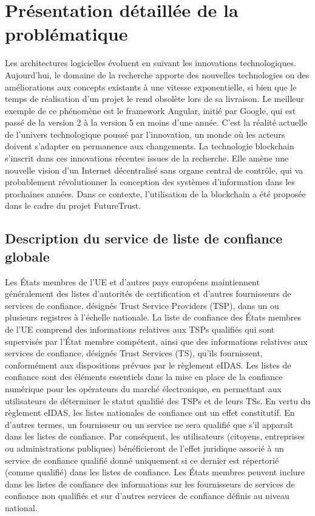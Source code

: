 \documentclass{tnreport}
\begin{document}
\chapter{Présentation détaillée de la problématique}

Les architectures logicielles évoluent en suivant les innovations technologiques. Aujourd'hui, le domaine de la recherche apporte des nouvelles technologies ou des améliorations aux concepts existants à une vitesse exponentielle, si bien que 
le temps de réalisation d'un projet le rend obsolète lors de sa livraison.
Le meilleur exemple de ce phénomène est le framework Angular, initié par Google, qui est passé de la version 2 à la version 5 en moins d'une année. C'est la réalité actuelle de l'univers technologique poussé par l'innovation, un monde où les acteurs doivent s'adapter en permanence aux changements. La technologie blockchain s'inscrit dans ces innovations récentes issues de la recherche. Elle amène une nouvelle vision d'un Internet décentralisé sans organe central de contrôle, qui va probablement révolutionner la conception des systèmes d'information dans les prochaines années. Dans ce contexte, l'utilisation de la blockchain a été proposée dans le cadre du projet FutureTrust.

\section{Description du service de liste de confiance globale}
\label{sec:description}

Les États membres de l'UE et d'autres pays européens maintiennent généralement des listes d'autorités de certification et d'autres fournisseurs de services de confiance, désignés Trust Service Providers (TSP), dans un ou plusieurs registres à l'échelle nationale.
La liste de confiance des États membres de l'UE comprend des informations relatives aux TSPs qualifiés qui sont supervisés par l'État membre compétent, ainsi que des informations relatives aux services de confiance, désignés Trust Services (TS), qu'ils fournissent, conformément aux dispositions prévues par le règlement eIDAS.
Les listes de confiance sont des éléments essentiels dans la mise en place de la confiance numérique pour les opérateurs du marché électronique, en permettant aux utilisateurs de déterminer le statut qualifié des TSPs et de leurs TSs. En vertu du règlement eIDAS, les listes nationales de confiance ont un effet constitutif.
En d'autres termes, un fournisseur ou un service ne sera qualifié que s'il apparaît dans les listes de confiance. Par conséquent, les utilisateurs (citoyens, entreprises ou administrations publiques) bénéficieront de l'effet juridique associé à un service de confiance qualifié donné uniquement si ce dernier est répertorié (comme qualifié) dans les listes de confiance.	
Les États membres peuvent inclure dans les listes de confiance des informations sur les fournisseurs de services de confiance non qualifiés et sur d'autres services de confiance définis au niveau national.
\end{document}

